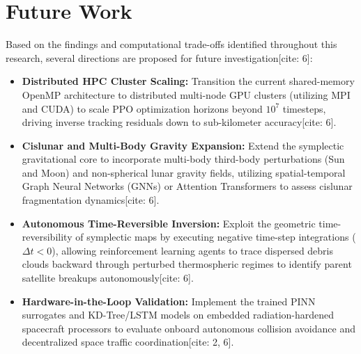 \documentclass[12pt,letterpaper,twoside]{book}
\begin{document}
\section{Future Work}
Based on the findings and computational trade-offs identified throughout this research, several directions are proposed for future investigation[cite: 6]:
\begin{itemize}
    \item \textbf{Distributed HPC Cluster Scaling:} Transition the current shared-memory OpenMP architecture to distributed multi-node GPU clusters (utilizing MPI and CUDA) to scale PPO optimization horizons beyond $10^7$ timesteps, driving inverse tracking residuals down to sub-kilometer accuracy[cite: 6].
    \item \textbf{Cislunar and Multi-Body Gravity Expansion:} Extend the symplectic gravitational core to incorporate multi-body third-body perturbations (Sun and Moon) and non-spherical lunar gravity fields, utilizing spatial-temporal Graph Neural Networks (GNNs) or Attention Transformers to assess cislunar fragmentation dynamics[cite: 6].
    \item \textbf{Autonomous Time-Reversible Inversion:} Exploit the geometric time-reversibility of symplectic maps by executing negative time-step integrations ($\Delta t < 0$), allowing reinforcement learning agents to trace dispersed debris clouds backward through perturbed thermospheric regimes to identify parent satellite breakups autonomously[cite: 6].
    \item \textbf{Hardware-in-the-Loop Validation:} Implement the trained PINN surrogates and KD-Tree/LSTM models on embedded radiation-hardened spacecraft processors to evaluate onboard autonomous collision avoidance and decentralized space traffic coordination[cite: 2, 6].
\end{itemize}

\cleardoublepage



\end{document}
